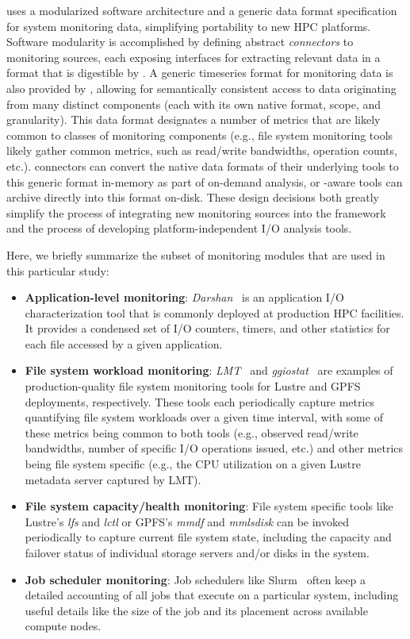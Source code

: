\tokio uses a modularized software architecture and a generic data format specification for system monitoring data, simplifying portability to new HPC platforms. Software modularity is accomplished by defining abstract \textit{connectors} to monitoring sources, each exposing interfaces for extracting relevant data in a format that is digestible by \tokio.  A generic timeseries format for monitoring data is also provided by \tokio, allowing for semantically consistent access to data originating from many distinct components (each with its own native format, scope, and granularity). This data format designates a number of metrics that are likely common to classes of monitoring components (e.g., file system monitoring tools likely gather common metrics, such as read/write bandwidths, operation counts, etc.). \tokio connectors can convert the native data formats of their underlying tools to this generic format in-memory as part of on-demand analysis, or \tokio-aware tools can archive directly into this format on-disk. These design decisions both greatly simplify the process of integrating new monitoring sources into the framework and the process of developing platform-independent I/O analysis tools.

Here, we briefly summarize the subset of \tokio monitoring modules that are used
in this particular study:

\begin{itemize}[leftmargin=*]
\item \textbf{Application-level monitoring}: \textit{Darshan}~\cite{Carns2009} is an application I/O characterization tool that is commonly deployed at production HPC facilities. It provides a condensed set of I/O counters, timers, and other statistics for each file accessed by a given application.

\item \textbf{File system workload monitoring}: \textit{LMT}~\cite{lmt} and \textit{ggiostat}~\cite{Lockwood2017} are examples of 
production-quality file system monitoring tools for Lustre and GPFS deployments, respectively. These tools each periodically capture metrics quantifying file system workloads over a given time interval, with some of these metrics being common to both tools (e.g., observed read/write bandwidths, number of specific I/O operations issued, etc.) and other metrics being file system specific (e.g., the CPU utilization on a given Lustre metadata server captured by LMT).

\item \textbf{File system capacity/health monitoring}: File system specific tools like Lustre's \textit{lfs} and \textit{lctl} or GPFS's \textit{mmdf} and \textit{mmlsdisk} can be invoked periodically to capture current file system state, including the capacity and failover status of individual storage servers and/or disks in the system.

\item \textbf{Job scheduler monitoring}: Job schedulers like Slurm~\cite{2003slurm} often keep a detailed accounting of all jobs that execute on a particular system, including useful details like the size of the job and its placement across available compute nodes.
\end{itemize}

